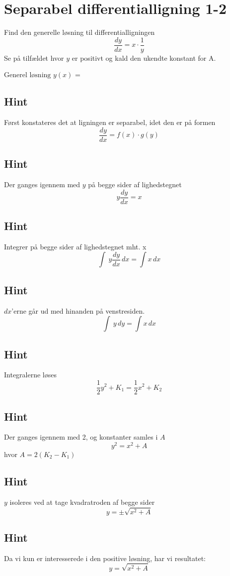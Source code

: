 \documentclass{article}
\newenvironment{exercise}[1]{\newpage\section{#1}}{}
\newcommand{\answerbox}[1]{\fbox{$#1$}}
\newcommand{\hint}{\subsection*{Hint}}
\begin{document}
\begin{exercise}{Separabel differentialligning 1-2}

	
	Find den generelle løsning til differentialligningen 
	\[
	\frac{dy}{dx} = x  \cdot \frac{1}{y}
	\]
	Se på tilfældet hvor $y$ er positivt og kald den ukendte konstant for A.
	
	$\textrm{Generel løsning } y(x)$ = \answerbox{\sqrt{x^2 + A}}
	
	\hint
	
	Først konstateres det at ligningen er separabel, idet den er på formen
	\[
	\frac{dy}{dx} = f(x) \cdot g(y)
	\]
	
	\hint 
	Der ganges igennem med $y$ på begge sider af lighedstegnet
	\[
	y \frac{dy}{dx} = x
	\]
	
	\hint
	
	Integrer på begge sider af lighedstegnet mht. x
	\[
	\int\ y \frac{dy}{dx}\, dx= \int x\,dx
	\]
	
	\hint
	
	$dx$'erne går ud med hinanden på venstresiden.
	\[
	\int\ y \, dy= \int x\,dx
	\]
	
	\hint
	
	Integralerne løses
	\[
	\frac{1}{2} y^2 + K_1 = \frac{1}{2} x^2 + K_2
	\]
	
	
	\hint
	
	Der ganges igennem med 2, og konstanter samles i $A$
	\[
	y^2 = x^2 + A
	\]
	hvor $A=2(K_2-K_1)$
	
	\hint
	
	$y$ isoleres ved at tage kvadratroden af begge sider
	\[
	y = \pm \sqrt{x^2 + A}
	\]

	\hint
	
	Da vi kun er interesserede i den positive løsning, har vi resultatet:
	\[
	y = \sqrt{x^2 + A}
	\]
	
\end{exercise}

\newpage
\end{document}
